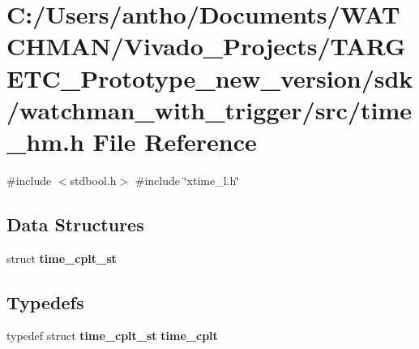 \section{C\+:/\+Users/antho/\+Documents/\+W\+A\+T\+C\+H\+M\+A\+N/\+Vivado\+\_\+\+Projects/\+T\+A\+R\+G\+E\+T\+C\+\_\+\+Prototype\+\_\+new\+\_\+version/sdk/watchman\+\_\+with\+\_\+trigger/src/time\+\_\+hm.h File Reference}
\label{time__hm_8h}
{\ttfamily \#include $<$stdbool.\+h$>$}\newline
{\ttfamily \#include \char`\"{}xtime\+\_\+l.\+h\char`\"{}}\newline
\subsection*{Data Structures}
\begin{DoxyCompactItemize}
\item 
struct \textbf{ time\+\_\+cplt\+\_\+st}
\end{DoxyCompactItemize}
\subsection*{Typedefs}
\begin{DoxyCompactItemize}
\item 
\mbox{\label{time__hm_8h_a6e47e3d6ddc9a938194544edefcb8f5a}} 
typedef struct \textbf{ time\+\_\+cplt\+\_\+st} {\bfseries time\+\_\+cplt}
\end{DoxyCompactItemize}

